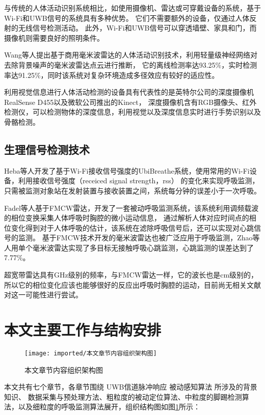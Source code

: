 与传统的人体活动识别系统相比，如使用摄像机、雷达或可穿戴设备的系统，基于Wi-Fi和UWB信号的系统具有多种优势。
它们不需要额外的设备，仅通过人体反射的无线信号检测活动。
此外，Wi-Fi和UWB信号可以穿透墙壁、家具和门，而摄像机则需要良好的照明条件。 

Wang等人\cite{Wang_Wifi_HAR}提出基于商用毫米波雷达的人体活动识别技术，利用轻量级神经网络对去除背景噪声的毫米波雷达点云进行推断，
它的离线检测率达93.25\%，实时检测率达91.25\%，同时该系统对复杂环境造成多径效应有较好的适应性。

利用视觉信息进行人体活动检测的设备具有代表性的是英特尔公司的深度摄像机RealSense D455以及微软公司推出的Kinect，
深度摄像机含有RGB摄像头、红外检测仪，可以检测物体的深度信息，利用视觉以及深度信息实时进行手势识别以及骨骼检测。

\subsection{生理信号检测技术}
Heba等人\cite{UbiBreathe}开发了基于Wi-Fi接收信号强度的UbiBreathe系统，使用常用的Wi-Fi设备，利用接收信号强度（receiced signal strength，rss）
的变化来实现呼吸监测，只需被监测对象站在发射装置与接收装置之间，系统每分钟的误差小于一次呼吸。

Fadel等人\cite{Adib_Breathe}基于FMCW雷达，开发了一套被动呼吸监测系统，该系统利用调频载波的相位变换采集人体呼吸时胸腔的微小运动信息，
通过解析人体对应时间点的相位变化得到对于人体呼吸的估计，该系统在滤除呼吸信号后，还可以实现对心跳信号的监测。
基于FMCW技术开发的毫米波雷达也被广泛应用于呼吸监测，Zhao等人\cite{zhao_Breathe}用单个毫米波雷达实现了多目标无接触呼吸心跳监测，心跳监测的误差达到了7.77\%。

超宽带雷达具有GHz级别的频率，与FMCW雷达一样，它的波长也是cm级别的，所以它的相位变化应该也能够很好的反应出呼吸时胸腔的运动，目前尚无相关文献对这一可能性进行尝试。

\section{本文主要工作与结构安排}
\begin{figure}[htbp]
    \centering
    \texttt{[image: imported/本文章节内容组织架构图]}
    \caption{\label{fig:structure}本文章节内容组织架构图}
\end{figure}
本文共有七个章节，各章节围绕 UWB信道脉冲响应 被动感知算法 所涉及的背景知识、
数据采集与预处理方法、粗粒度的被动定位算法、中粒度的脚踢检测算法，以及细粒度的呼吸监测算法展开，组织结构图如图\ref{fig:structure}所示：

